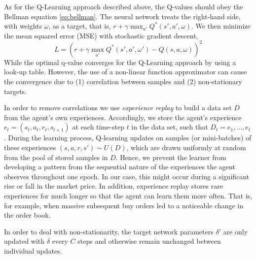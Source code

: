 
As for the Q-Learning approach described above, the Q-values should obey the Bellman equation \ref{eq:bellman}.
The neural network treats the right-hand side, with weights $\omega$, as a target, that is, $r+\gamma \max_{a'} Q^*(s',a', \omega)$.
We then minimize the mean squared error (MSE) with stochastic gradient descent,
\begin{equation}
    L=(r+\gamma \max_{a'} Q^*(s',a', \omega') - Q(s,a,\omega))^2
\end{equation}
While the optimal q-value converges for the Q-Learning approach by using a look-up table.
However, the use of a non-linear function approximator can cause the convergence due to (1) correlation between samples and (2) non-stationary targets.

In order to remove correlations we use \textit{experience replay} to build a data set $D$ from the agent's own experiences.
Accordingly, we store the agent's experience $e_t=(s_t, a_t, r_t, s_{t+1})$ at each time-step $t$ in the data set, such that $D_t = {e_1, ..., e_t}$.
During the learning process, Q-learning updates on samples (or mini-batches) of these experiences $(s,a,r,s') \sim U(D)$, which are drawn uniformly at random from the pool of stored samples in $D$.
Hence, we prevent the learner from developing a pattern from the sequential nature of the experiences the agent observes throughout one epoch.
In our case, this might occur during a significant rise or fall in the market price.
In addition, experience replay stores rare experiences for much longer so that the agent can learn them more often.
That is, for example, when massive subsequent buy orders led to a noticeable change in the order book.

In order to deal with non-stationarity, the target network parameters $\delta'$ are only updated with $\delta$ every $C$ steps and otherwise remain unchanged between individual updates.
